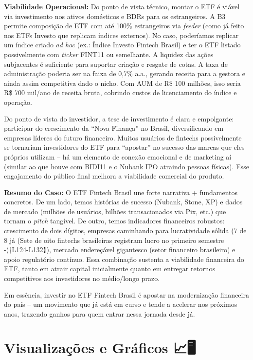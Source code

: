 \documentclass[12pt]{article}
\begin{document}
\textbf{Viabilidade Operacional:} Do ponto de vista técnico, montar o ETF é viável via investimento nos ativos domésticos e BDRs para os estrangeiros. A B3 permite composição de ETF com até 100\% estrangeiros via \textit{feeder} (como já feito nos ETFs Investo que replicam índices externos). No caso, poderíamos replicar um índice criado \textit{ad hoc} (ex.: Índice Investo Fintech Brasil) e ter o ETF listado possivelmente com \textit{ticker} FINT11 ou semelhante. A liquidez das ações subjacentes é suficiente para suportar criação e resgate de cotas. A taxa de administração poderia ser na faixa de 0,7\% a.a., gerando receita para a gestora e ainda assim competitiva dado o nicho. Com AUM de R\$ 100 milhões, isso seria R\$ 700 mil/ano de receita bruta, cobrindo custos de licenciamento do índice e operação.

Do ponto de vista do investidor, a tese de investimento é clara e empolgante: participar do crescimento da “Nova Finança” no Brasil, diversificando em empresas líderes do futuro financeiro. Muitos usuários de fintechs possivelmente se tornariam investidores do ETF para “apostar” no sucesso das marcas que eles próprios utilizam – há um elemento de conexão emocional e de marketing aí (similar ao que houve com BIDI11 e o Nubank IPO atraindo pessoas físicas). Esse engajamento do público final melhora a viabilidade comercial do produto.

\textbf{Resumo do Caso:} O ETF Fintech Brasil une forte narrativa + fundamentos concretos. De um lado, temos histórias de sucesso (Nubank, Stone, XP) e dados de mercado (milhões de usuários, bilhões transacionados via Pix, etc.) que tornam o \textit{pitch} tangível. De outro, temos indicadores financeiros robustos: crescimento de dois dígitos, empresas caminhando para lucratividade sólida (7 de 8 já (Sete de oito fintechs brasileiras registram lucro no primeiro semestre -)†L124-L132】), mercado endereçável gigantesco (setor financeiro brasileiro) e apoio regulatório contínuo. Essa combinação sustenta a viabilidade financeira do ETF, tanto em atrair capital inicialmente quanto em entregar retornos competitivos aos investidores no médio/longo prazo.

Em essência, investir no ETF Fintech Brasil é apostar na modernização financeira do país – um movimento que já está em curso e tende a acelerar nos próximos anos, trazendo ganhos para quem entrar nessa jornada desde já.

\section*{Visualizações e Gráficos 📈🖥️}
\end{document}
